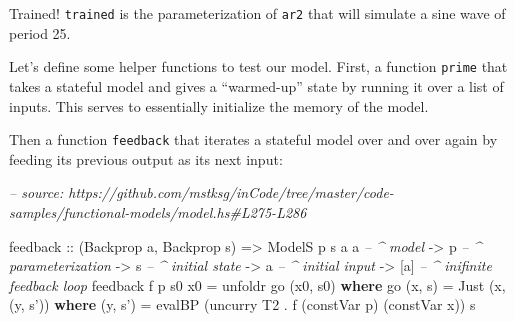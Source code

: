 \documentclass[]{article}
\newenvironment{Shaded}{}{}
\newcommand{\CommentTok}[1]{\textcolor[rgb]{0.38,0.63,0.69}{\textit{#1}}}
\newcommand{\DataTypeTok}[1]{\textcolor[rgb]{0.56,0.13,0.00}{#1}}
\newcommand{\FunctionTok}[1]{\textcolor[rgb]{0.02,0.16,0.49}{#1}}
\newcommand{\KeywordTok}[1]{\textcolor[rgb]{0.00,0.44,0.13}{\textbf{#1}}}
\newcommand{\NormalTok}[1]{#1}
\newcommand{\OtherTok}[1]{\textcolor[rgb]{0.00,0.44,0.13}{#1}}
\begin{document}
Trained! \texttt{trained} is the parameterization of \texttt{ar2} that will
simulate a sine wave of period 25.

Let's define some helper functions to test our model. First, a function
\texttt{prime} that takes a stateful model and gives a ``warmed-up'' state by
running it over a list of inputs. This serves to essentially initialize the
memory of the model.

\begin{Shaded}
\end{Shaded}

Then a function \texttt{feedback} that iterates a stateful model over and over
again by feeding its previous output as its next input:

\begin{Shaded}
\begin{Highlighting}[]
\CommentTok{-- source: https://github.com/mstksg/inCode/tree/master/code-samples/functional-models/model.hs#L275-L286}

\NormalTok{feedback}
\OtherTok{    ::}\NormalTok{ (}\DataTypeTok{Backprop}\NormalTok{ a, }\DataTypeTok{Backprop}\NormalTok{ s)}
    \OtherTok{=>} \DataTypeTok{ModelS}\NormalTok{ p s a a     }\CommentTok{-- ^ model}
    \OtherTok{->}\NormalTok{ p                  }\CommentTok{-- ^ parameterization}
    \OtherTok{->}\NormalTok{ s                  }\CommentTok{-- ^ initial state}
    \OtherTok{->}\NormalTok{ a                  }\CommentTok{-- ^ initial input}
    \OtherTok{->}\NormalTok{ [a]                }\CommentTok{-- ^ inifinite feedback loop}
\NormalTok{feedback f p s0 x0 }\FunctionTok{=}\NormalTok{ unfoldr go (x0, s0)}
  \KeywordTok{where}
\NormalTok{    go (x, s) }\FunctionTok{=} \DataTypeTok{Just}\NormalTok{ (x, (y, s'))}
      \KeywordTok{where}
\NormalTok{        (y, s') }\FunctionTok{=}\NormalTok{ evalBP (uncurry }\DataTypeTok{T2} \FunctionTok{.}\NormalTok{ f (constVar p) (constVar x)) s}
\end{Highlighting}
\end{Shaded}
\end{document}
